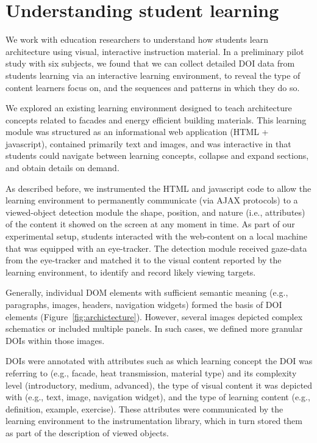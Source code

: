 \section{Understanding student learning}
\label{sec:ExperimentArchitecture}
We work with education researchers to understand how students learn architecture using visual, interactive instruction material. In a preliminary pilot study with six subjects, we found that we can collect detailed DOI data from students learning via an interactive learning environment, to reveal the type of content learners focus on, and the sequences and patterns in which they do so. 

We explored an existing learning environment designed to teach architecture concepts related to facades and energy efficient building materials. This learning module was structured as an informational web application (HTML + javascript), contained primarily text and images, and was interactive in that students could navigate between learning concepts, collapse and expand sections, and obtain details on demand. 

As described before, we instrumented the HTML and javascript code to allow the learning environment to permanently communicate (via AJAX protocols) to a viewed-object detection module the shape, position, and nature (i.e., attributes) of the content it showed on the screen at any moment in time. As part of our experimental setup, students interacted with the web-content on a local machine that was equipped with an eye-tracker. The detection module received gaze-data from the eye-tracker and matched it to the visual content reported by the learning environment, to identify and record likely viewing targets.

Generally, individual DOM elements with sufficient semantic meaning (e.g., paragraphs, images, headers, navigation widgets) formed the basis of DOI elements (Figure~\ref{fig:archictecture}). However, several images depicted complex schematics or included multiple panels. In such cases, we defined more granular DOIs within those images. 

DOIs were annotated with attributes such as which learning concept the DOI was referring to (e.g., facade, heat transmission, material type) and its complexity level (introductory, medium, advanced), the type of visual content it was depicted with (e.g., text, image, navigation widget), and the type of learning content (e.g., definition, example, exercise). These attributes were communicated by the learning environment to the instrumentation library, which in turn stored them as part of the description of viewed objects.

